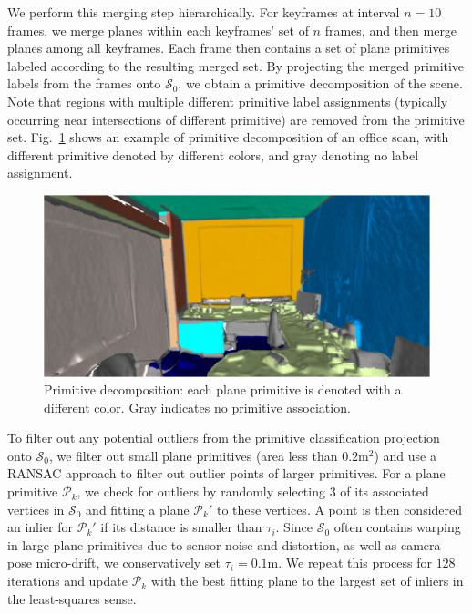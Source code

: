 We perform this merging step hierarchically.
For keyframes at interval $n = 10$ frames, we merge planes within each keyframes' set of $n$ frames, and then merge planes among all keyframes.
Each frame then contains a set of plane primitives labeled according to the resulting merged set.
By projecting the merged primitive labels from the frames onto $\mathcal{S}_0$, we obtain a primitive decomposition of the scene. 
Note that regions with multiple different primitive label assignments (typically occurring near intersections of different primitive) are removed from the primitive set.
Fig.~\ref{fig:3dlite-plane-classify} shows an example of primitive decomposition of an office scan, with different primitive denoted by different colors, and gray denoting no label assignment.
 
\begin{figure}
    \centering
    \includegraphics[width=0.97\linewidth]{3dlite/fig3.png}
    \caption{
        Primitive decomposition: each plane primitive is denoted with a different color. Gray indicates no primitive association.
    }
    \label{fig:3dlite-plane-classify}

\end{figure}

To filter out any potential outliers from the primitive classification projection onto $\mathcal{S}_0$, we filter out small plane primitives (area less than $0.2$m$^2$) and use a RANSAC approach to filter out outlier points of larger primitives.
For a plane primitive $\mathcal{P}_k$, we check for outliers by randomly selecting $3$ of its associated vertices in $\mathcal{S}_0$ and fitting a plane $\mathcal{P}_k'$ to these vertices. 
A point is then considered an inlier for $\mathcal{P}_k'$ if its distance is smaller than $\tau_i$. 
Since $\mathcal{S}_0$ often contains warping in large plane primitives due to sensor noise and distortion, as well as camera pose micro-drift, we conservatively set $\tau_i = 0.1$m.
We repeat this process for $128$ iterations and update $\mathcal{P}_k$ with the best fitting plane to the largest set of inliers in the least-squares sense.

